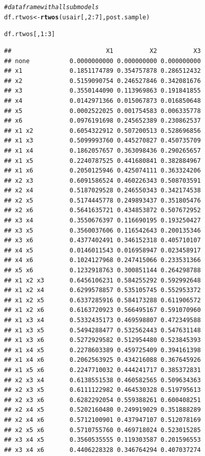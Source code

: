 \documentclass[11pt,a4paper,twoside]{book}
\makeatletter
\newcommand{\hlnum}[1]{\textcolor[rgb]{0.686,0.059,0.569}{#1}}%
\newcommand{\hlcom}[1]{\textcolor[rgb]{0.678,0.584,0.686}{\textit{#1}}}%
\newcommand{\hlopt}[1]{\textcolor[rgb]{0,0,0}{#1}}%
\newcommand{\hlstd}[1]{\textcolor[rgb]{0.345,0.345,0.345}{#1}}%
\newcommand{\hlkwb}[1]{\textcolor[rgb]{0.69,0.353,0.396}{#1}}%
\newcommand{\hlkwd}[1]{\textcolor[rgb]{0.737,0.353,0.396}{\textbf{#1}}}%
\newenvironment{kframe}{%
 \def\at@end@of@kframe{}%
 \ifinner\ifhmode%
  \def\at@end@of@kframe{\end{minipage}}%
  \begin{minipage}{\columnwidth}%
 \fi\fi%
 \def\FrameCommand##1{\hskip\@totalleftmargin \hskip-\fboxsep
 \colorbox{shadecolor}{##1}\hskip-\fboxsep
     \hskip-\linewidth \hskip-\@totalleftmargin \hskip\columnwidth}%
 \MakeFramed {\advance\hsize-\width
   \@totalleftmargin\z@ \linewidth\hsize
   \@setminipage}}%
 {\par\unskip\endMakeFramed%
 \at@end@of@kframe}
\newenvironment{knitrout}{}{} %
\makeatother
\begin{document}
\begin{knitrout}
\begin{kframe}
\begin{alltt}
\hlcom{#data frame with all submodels}
\hlstd{df.rtwos} \hlkwb{<-}\hlkwd{rtwos}\hlstd{(usair[,}\hlnum{2}\hlopt{:}\hlnum{7}\hlstd{], post.sample)}

\hlstd{df.rtwos[,}\hlnum{1}\hlopt{:}\hlnum{3}\hlstd{]}
\end{alltt}
\begin{verbatim}
##                          X1          X2          X3
## none           0.0000000000 0.000000000 0.000000000
## x1             0.1851174789 0.354757878 0.286512432
## x2             0.5159090754 0.246527846 0.342081676
## x3             0.3550144090 0.113969863 0.191841855
## x4             0.0142971366 0.015067873 0.016850648
## x5             0.0002522025 0.001754583 0.006335778
## x6             0.0976191698 0.245652389 0.230862537
## x1 x2          0.6054322912 0.507200513 0.528696856
## x1 x3          0.5099993760 0.445270827 0.450735709
## x1 x4          0.1862057657 0.363098436 0.290265657
## x1 x5          0.2240787525 0.441680841 0.382884967
## x1 x6          0.2050125946 0.425074111 0.363324206
## x2 x3          0.6091586524 0.460226343 0.508703591
## x2 x4          0.5187029528 0.246550343 0.342174538
## x2 x5          0.5174445778 0.249893437 0.351805476
## x2 x6          0.5641635721 0.434853872 0.507672952
## x3 x4          0.3550676397 0.116690195 0.193250427
## x3 x5          0.3560037606 0.116542643 0.200135346
## x3 x6          0.4377402491 0.346152318 0.405710107
## x4 x5          0.0146011543 0.016958947 0.023458917
## x4 x6          0.1024127968 0.247415066 0.233531366
## x5 x6          0.1232918763 0.300851144 0.264298788
## x1 x2 x3       0.6456106231 0.584255292 0.592992648
## x1 x2 x4       0.6299578857 0.535105745 0.552953372
## x1 x2 x5       0.6337285916 0.584173288 0.611906572
## x1 x2 x6       0.6163720923 0.566495167 0.591070960
## x1 x3 x4       0.5332435173 0.469598807 0.472349588
## x1 x3 x5       0.5494288477 0.532562443 0.547631148
## x1 x3 x6       0.5272929582 0.512954480 0.523845393
## x1 x4 x5       0.2278603389 0.459725409 0.394161398
## x1 x4 x6       0.2062563925 0.434216088 0.367645926
## x1 x5 x6       0.2247710032 0.444241717 0.385372831
## x2 x3 x4       0.6138551538 0.460582565 0.509634363
## x2 x3 x5       0.6111122982 0.464530328 0.519795613
## x2 x3 x6       0.6282292054 0.559388261 0.600408251
## x2 x4 x5       0.5202160480 0.249919029 0.351888289
## x2 x4 x6       0.5712100901 0.437947107 0.512078169
## x2 x5 x6       0.5710755760 0.469718024 0.523015285
## x3 x4 x5       0.3560535555 0.119303587 0.201596553
## x3 x4 x6       0.4406228328 0.346764294 0.407037274

\end{verbatim}
\end{kframe}
\end{knitrout}
\end{document}
